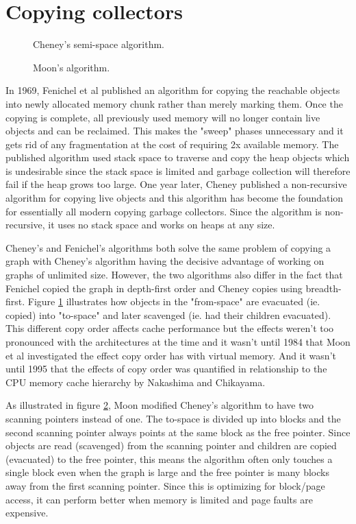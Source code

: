 \documentclass[a4paper,oneside]{memoir}
\begin{document}
\section{Copying collectors}
\begin{figure}
  \centering
  
  \caption{Cheney's semi-space algorithm.}
  \label{cheney_algorithm}
\end{figure}
\begin{figure}[b]
  \centering
  
  \caption{Moon's algorithm.}
  \label{moon_algorithm}
\end{figure}

In 1969, Fenichel et al published an algorithm for copying the reachable objects
into newly allocated memory chunk rather than merely marking them.\cite{Fenichel} Once the copying
is complete, all previously used memory will no longer contain live objects
and can be reclaimed. This makes the "sweep" phases unnecessary and it gets rid
of any fragmentation at the cost of requiring 2x available memory. The published
algorithm used stack space to traverse and copy the heap objects which is
undesirable since the stack space is limited and garbage collection will therefore
fail if the heap grows too large. One year later, Cheney published a non-recursive
algorithm for copying live objects and this algorithm has become the foundation
for essentially all modern copying garbage collectors.\cite{Cheney:1970} Since the algorithm is
non-recursive, it uses no stack space and works on heaps at any size.

Cheney's and Fenichel's algorithms both solve the same problem of copying a graph
with Cheney's algorithm having the decisive advantage of working on graphs of
unlimited size. However, the two algorithms also differ in the fact that Fenichel
copied the graph in depth-first order and Cheney copies using breadth-first.
Figure \ref{cheney_algorithm} illustrates how objects in the "from-space"
are evacuated (ie. copied) into "to-space" and later scavenged (ie. had their
children evacuated).
This
different copy order affects cache performance but the effects weren't too pronounced
with the architectures at the time and it wasn't until 1984 that Moon et al
investigated the effect copy order has with virtual memory. And it wasn't until
1995 that the effects of copy order was quantified in relationship to the
CPU memory cache hierarchy by Nakashima and Chikayama.\cite{Nakashima:1995}

As illustrated in figure \ref{moon_algorithm}, Moon modified Cheney's algorithm to have two scanning pointers instead of one.\cite{Moon:1984}
The to-space is divided up into blocks and the second scanning pointer always
points at the same block as the free pointer. Since objects are read (scavenged)
from the scanning pointer and children are copied (evacuated) to the free pointer,
this means the algorithm often only touches a single block even when the graph
is large and the free pointer is many blocks away from the first scanning pointer.
Since this is optimizing for block/page access, it can perform better when memory
is limited and page faults are expensive.
\end{document}
